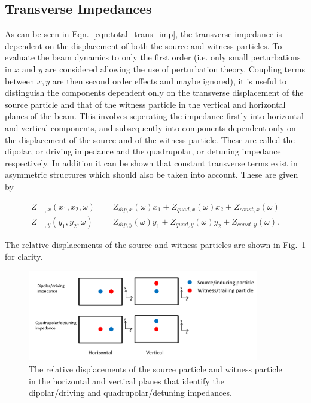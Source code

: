 \subsection{Transverse Impedances}

As can be seen in Eqn.~\ref{eqn:total_trans_imp}, the transverse impedance is dependent on the displacement of both the source and witness particles. To evaluate the beam dynamics to only the first order (i.e. only small perturbations in $x$ and $y$ are considered allowing the use of perturbation theory. Coupling terms between $x,y$ are then second order effects and maybe ignored), it is useful to distinguish the components dependent only on the transverse displacement of the source particle and that of the witness particle in the vertical and horizontal planes of the beam. This involves seperating the impedance firstly into horizontal and vertical components, and subsequently into components dependent only on the displacement of the source and of the witness particle. These are called the dipolar, or driving impedance and the quadrupolar, or detuning impedance respectively. In addition it can be shown that constant transverse terms exist in asymmetric structures which should also be taken into account. These are given by

\begin{align}
Z_{\perp, x} \left( x_{1}, x_{2}, \omega \right) &= Z_{dip, x} \left( \omega  \right) x_{1} +  Z_{quad, x} \left( \omega   \right)x_{2} + Z_{const, x} \left( \omega  \right) \\
Z_{\perp, y} \left( y_{1}, y_{2}, \omega \right) &= Z_{dip, y} \left( \omega  \right)y_{1} +  Z_{quad, y} \left( \omega \right)y_{2} + Z_{const, y} \left( \omega  \right).
\end{align}

The relative displacements of the source and witness particles are shown in Fig.~\ref{fig:trans_imp_disp} for clarity.

\begin{figure}
\begin{center}
\includegraphics[width=0.9\textwidth]{Wakefields_and_Impedances/figures/impedance-des.pdf}
\end{center}
\caption{The relative displacements of the source particle and witness particle in the horizontal and vertical planes that identify the dipolar/driving and quadrupolar/detuning impedances.}
\label{fig:trans_imp_disp}
\end{figure}

